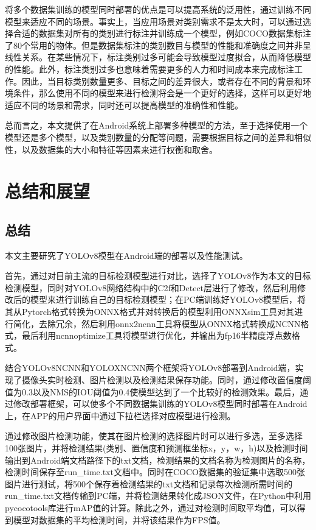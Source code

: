 \documentclass{ctexart}
\numberwithin{equation}{section}%
\numberwithin{figure}{section}%
\numberwithin{table}{section}%
\begin{document}
	将多个数据集训练的模型同时部署的优点是可以提高系统的泛用性，通过训练不同模型来适应不同的场景。事实上，当应用场景对类别需求不是太大时，可以通过选择合适的数据集对所有的类别进行标注并训练成一个模型，例如COCO数据集标注了80个常用的物体。但是数据集标注的类别数目与模型的性能和准确度之间并非呈线性关系。在某些情况下，标注类别过多可能会导致模型过度拟合，从而降低模型的性能。此外，标注类别过多也意味着需要更多的人力和时间成本来完成标注工作。因此，当目标类别数量更多、目标之间的差异很大，或者存在不同的背景和环境条件，那么使用不同的模型来进行检测将会是一个更好的选择，这样可以更好地适应不同的场景和需求，同时还可以提高模型的准确性和性能。
	
	总而言之，本文提供了在Android系统上部署多种模型的方法，至于选择使用一个模型还是多个模型，以及类别数量的分配等问题，需要根据目标之间的差异和相似性，以及数据集的大小和特征等因素来进行权衡和取舍。
	
	
	\newpage
	\section{总结和展望}
	\subsection{总结}
	本文主要研究了YOLOv8模型在Android端的部署以及性能测试。
	
	首先，通过对目前主流的目标检测模型进行对比，选择了YOLOv8作为本文的目标检测模型，同时对YOLOv8网络结构中的C2f和Detect层进行了修改，然后利用修改后的模型来进行训练自己的目标检测模型；在PC端训练好YOLOv8模型后，将其从Pytorch格式转换为ONNX格式并对转换后的模型利用ONNXsim工具对其进行简化，去除冗余，然后利用onnx2ncnn工具将模型从ONNX格式转换成NCNN格式，最后利用ncnnoptimize工具将模型进行优化，并输出为fp16半精度浮点数格式。
	
	结合YOLOv8NCNN和YOLOXNCNN两个框架将YOLOv8部署到Android端，实现了摄像头实时检测、图片检测以及检测结果保存功能。同时，通过修改置信度阈值为0.3以及NMS的IOU阈值为0.4使模型达到了一个比较好的检测效果。最后，通过修改部署框架，可以使多个不同数据集训练的YOLOv8模型同时部署在Android上，在APP的用户界面中通过下拉栏选择对应模型进行检测。
	
	通过修改图片检测功能，使其在图片检测的选择图片时可以进行多选，至多选择100张图片，并将检测结果(类别、置信度和预测框坐标x，y，w，h)以及检测时间输出到Android端文档路径下的txt文档，检测结果的文档名称为检测图片的名称，检测时间保存至run\_time.txt文档中。同时在COCO数据集的验证集中选取500张图片进行测试，将500个保存着检测结果的txt文档和记录每次检测所需时间的run\_time.txt文档传输到PC端，并将检测结果转化成JSON文件，在Python中利用pycocotools库进行mAP值的计算。除此之外，通过对检测时间取平均值，可以得到模型对数据集的平均检测时间，并将该结果作为FPS值。
	
\end{document}
